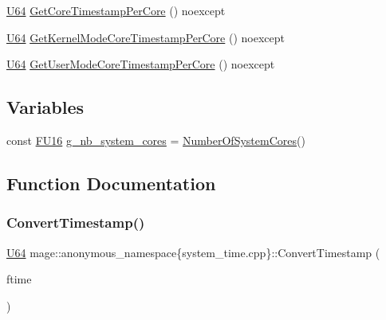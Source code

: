 \begin{DoxyCompactItemize}
\mbox{\hyperlink{namespacemage_ae0ad2dd0035dba92ed0f2e84c182b03b}{U64}} \mbox{\hyperlink{namespacemage_1_1anonymous__namespace_02system__time_8cpp_03_ab1a6d7a9936cb74fd15d489f4212762b}{Get\+Core\+Timestamp\+Per\+Core}} () noexcept
\item 
\mbox{\hyperlink{namespacemage_ae0ad2dd0035dba92ed0f2e84c182b03b}{U64}} \mbox{\hyperlink{namespacemage_1_1anonymous__namespace_02system__time_8cpp_03_afc730fda25530d33c1887b9ad44d04e9}{Get\+Kernel\+Mode\+Core\+Timestamp\+Per\+Core}} () noexcept
\item 
\mbox{\hyperlink{namespacemage_ae0ad2dd0035dba92ed0f2e84c182b03b}{U64}} \mbox{\hyperlink{namespacemage_1_1anonymous__namespace_02system__time_8cpp_03_a50f87297a0ecbde94ac88a35416c6add}{Get\+User\+Mode\+Core\+Timestamp\+Per\+Core}} () noexcept
\end{DoxyCompactItemize}
\subsection*{Variables}
\begin{DoxyCompactItemize}
\item 
const \mbox{\hyperlink{namespacemage_a4888c2a93673ffcfc3195e561dfdd893}{F\+U16}} \mbox{\hyperlink{namespacemage_1_1anonymous__namespace_02system__time_8cpp_03_a6d9f31c8eb634f0c671604d46e919ad0}{g\+\_\+nb\+\_\+system\+\_\+cores}} = \mbox{\hyperlink{namespacemage_a80d35f6d9871d86bf65c00d22b531e5d}{Number\+Of\+System\+Cores}}()
\end{DoxyCompactItemize}


\subsection{Function Documentation}
\mbox{\label{namespacemage_1_1anonymous__namespace_02system__time_8cpp_03_ac1448a2c7b4dc5805087ff492ef7015c}} 
\subsubsection{\texorpdfstring{Convert\+Timestamp()}{ConvertTimestamp()}}
{\footnotesize\ttfamily \mbox{\hyperlink{namespacemage_ae0ad2dd0035dba92ed0f2e84c182b03b}{U64}} mage\+::anonymous\+\_\+namespace\{system\+\_\+time.\+cpp\}\+::Convert\+Timestamp (\begin{DoxyParamCaption}\item[{const F\+I\+L\+E\+T\+I\+ME \&}]{ftime }\end{DoxyParamCaption})\hspace{0.3cm}{\ttfamily [noexcept]}}

